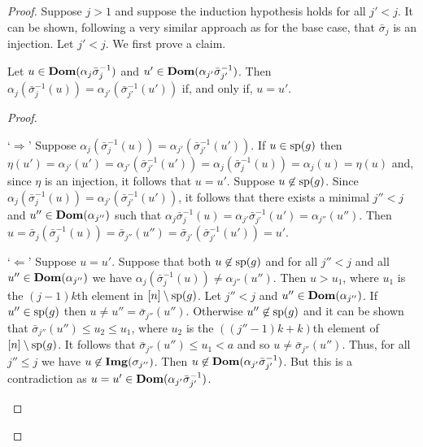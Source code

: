 \documentclass[../main/thesis.tex]{subfiles}
\begin{document}
\begin{proof}
  Suppose $j > 1$ and suppose the induction hypothesis holds for all $j' < j$.
  It can be shown, following a very similar approach as for the base case, that
  $\bar{\sigma}_j$ is an injection. Let $j' < j$. We first prove a claim.
  
  \begin{claim}
    Let $u \in \text{\textbf{Dom}}(\alpha_j \bar{\sigma}^{-1}_j)$ and $u' \in
    \text{\textbf{Dom}}(\alpha_{j'}\bar{\sigma}^{-1}_{j'})$. Then $\alpha_j
    (\bar{\sigma}^{-1}_j(u)) = \alpha_{j'}(\bar{\sigma}^{-1}_{j'}(u'))$ if, and
    only if, $u = u'$.
    \label{claim:compatibility}
  \end{claim}
  \begin{proof}
    \begin{myenum}
    \item[`$\Rightarrow$'] Suppose $\alpha_j (\bar{\sigma}^{-1}_j(u)) =
      \alpha_{j'}(\bar{\sigma}^{-1}_{j'}(u'))$. If $u \in \text{sp}(g)$ then
      $\eta(u') = \alpha_{j'}(u') = \alpha_{j'} (\bar{\sigma}^{-1}_{j'}(u')) =
      \alpha_j (\bar{\sigma}^{-1}_j(u)) = \alpha_j(u) = \eta (u)$ and, since
      $\eta$ is an injection, it follows that $u = u'$. Suppose $u \not\in
      \text{sp}(g)$. Since $\alpha_{j}(\bar{\sigma}^{-1}_{j}(u)) =
      \alpha_{j'}(\bar{\sigma}^{-1}_{j'}(u'))$, it follows that there exists a
      minimal $j'' < j$ and $u'' \in \text{\textbf{Dom}}(\alpha_{j''})$ such that $
      \alpha_{j}\bar{\sigma}^{-1}_{j}(u) = \alpha_{j'}
      \bar{\sigma}^{-1}_{j'}(u') = \alpha_{j''}(u'')$. Then $u =
      \bar{\sigma}_j(\bar{\sigma}^{-1}_j (u)) = \bar{\sigma}_{j''}(u'') =
      \bar{\sigma}_{j'}(\bar{\sigma}^{-1}_{j'} (u')) = u'$.

    \item[`$\Leftarrow$'] Suppose $u = u'$. Suppose that both $u \not\in
      \text{sp}(g)$ and for all $j'' < j$ and all $u'' \in \text{\textbf{Dom}}(\alpha_{j''})$ we
      have $\alpha_j(\bar{\sigma}^{-1}_j(u)) \neq \alpha_{j''}(u'')$. Then $u >
      u_1$, where $u_1$ is the $(j-1)k$th element in $[n] \setminus \text{sp}(g)$.
      Let $j'' < j$ and $u'' \in \text{\textbf{Dom}}(\alpha_{j''})$. If $u'' \in \text{sp}(g)$
      then $u \neq u'' = \bar{\sigma}_{j''}(u'')$. Otherwise $u'' \not\in
      \text{sp}(g)$ and it can be shown that $\bar{\sigma}_{j''}(u'') \leq u_2 \leq
      u_1$, where $u_2$ is the $((j'' - 1)k + k)$th element of $[n] \setminus
      \text{sp}(g)$. It follows that $\bar{\sigma}_{j''}(u'') \leq u_1< a$ and so
      $u \neq \bar{\sigma}_{j''}(u'')$. Thus, for all $j'' \leq j$ we have $u
      \not\in \text{\textbf{Img}}(\sigma_{j''})$. Then $u \not\in \text{\textbf{Dom}}(\alpha_{j'}
      \bar{\sigma}^{-1}_{j'})$. But this is a contradiction as $u = u' \in
      \text{\textbf{Dom}}(\alpha_{j'} \bar{\sigma}^{-1}_{j'})$.


\end{myenum}
\end{proof}
\end{proof}
\end{document}
